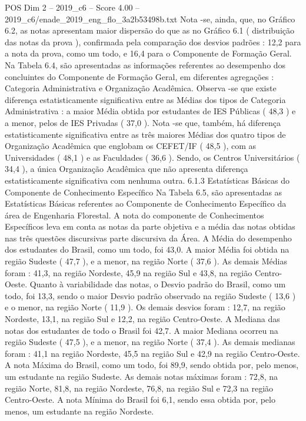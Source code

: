 \begin{textsample}{POS Dim 2 – 2019\_c6 – Score 4.00 – 2019\_c6/enade\_2019\_eng\_flo\_3a2b53498b.txt}
Nota -se, ainda, que, no Gráfico 6.2, as notas apresentam maior dispersão do que as no Gráfico 6.1 ( distribuição das notas da prova ), confirmada pela comparação dos desvios padrões : 12,2 para a nota da prova, como um todo, e 16,4 para o Componente de Formação Geral.
Na Tabela 6.4, são apresentadas as informações referentes ao desempenho dos concluintes do Componente de Formação Geral, em diferentes agregações : Categoria Administrativa e Organização Acadêmica.
Observa -se que existe diferença estatisticamente significativa entre as Médias dos tipos de Categoria Administrativa : a maior Média obtida por estudantes de IES Públicas ( 48,3 ) e a menor, pelos de IES Privadas ( 37,0 ).
Nota -se que, também, há diferença estatisticamente significativa entre as três maiores Médias dos quatro tipos de Organização Acadêmica que englobam os CEFET/IF ( 48,5 ), com as Universidades ( 48,1 ) e as Faculdades ( 36,6 ).
Sendo, os Centros Universitários ( 34,4 ), a única Organização Acadêmica que não apresenta diferença estatisticamente significativa com nenhuma outra. 6.1.3 Estatísticas Básicas do Componente de Conhecimento Específico Na Tabela 6.5, são apresentadas as Estatísticas Básicas referentes ao Componente de Conhecimento Específico da área de Engenharia Florestal.
A nota do componente de Conhecimentos Específicos leva em conta as notas da parte objetiva e a média das notas obtidas nas três questões discursivas parte discursiva da Área.
A Média do desempenho dos estudantes do Brasil, como um todo, foi 43,0.
A maior Média foi obtida na região Sudeste ( 47,7 ), e a menor, na região Norte ( 37,6 ).
As demais Médias foram : 41,3, na região Nordeste, 45,9 na região Sul e 43,8, na região Centro-Oeste.
Quanto à variabilidade das notas, o Desvio padrão do Brasil, como um todo, foi 13,3, sendo o maior Desvio padrão observado na região Sudeste ( 13,6 ) e o menor, na região Norte ( 11,9 ).
Os demais desvios foram : 12,7, na região Nordeste, 13,1, na região Sul e 12,2, na região Centro-Oeste.
A Mediana das notas dos estudantes de todo o Brasil foi 42,7.
A maior Mediana ocorreu na região Sudeste ( 47,5 ), e a menor, na região Norte ( 37,4 ).
As demais medianas foram : 41,1 na região Nordeste, 45,5 na região Sul e 42,9 na região Centro-Oeste.
A nota Máxima do Brasil, como um todo, foi 89,9, sendo obtida por, pelo menos, um estudante na região Sudeste.
As demais notas máximas foram : 72,8, na região Norte, 81,8, na região Nordeste, 76,8, na região Sul e 72,3 na região Centro-Oeste.
A nota Mínima do Brasil foi 6,1, sendo essa obtida por, pelo menos, um estudante na região Nordeste.

\end{textsample}
